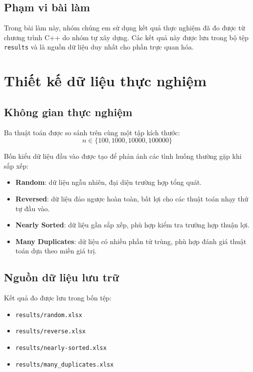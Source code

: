\subsection{Phạm vi bài làm}

Trong bài làm này, nhóm chúng em sử dụng kết quả thực nghiệm đã đo được từ chương trình C++ do nhóm tự xây dựng.
Các kết quả này được lưu trong bộ tệp \texttt{results} và là nguồn dữ liệu duy nhất cho phần trực quan hóa.

\section{Thiết kế dữ liệu thực nghiệm}

\subsection{Không gian thực nghiệm}

Ba thuật toán được so sánh trên cùng một tập kích thước:
\[
    n \in \{100, 1000, 10000, 100000\}
\]

Bốn kiểu dữ liệu đầu vào được tạo để phản ánh các tình huống thường gặp khi sắp xếp:
\begin{itemize}[leftmargin=1.2cm]
    \item \textbf{Random}: dữ liệu ngẫu nhiên, đại diện trường hợp tổng quát.
    \item \textbf{Reversed}: dữ liệu đảo ngược hoàn toàn, bất lợi cho các thuật toán nhạy thứ tự đầu vào.
    \item \textbf{Nearly Sorted}: dữ liệu gần sắp xếp, phù hợp kiểm tra trường hợp thuận lợi.
    \item \textbf{Many Duplicates}: dữ liệu có nhiều phần tử trùng, phù hợp đánh giá thuật toán dựa theo miền giá trị.
\end{itemize}

\subsection{Nguồn dữ liệu lưu trữ}

Kết quả đo được lưu trong bốn tệp:
\begin{itemize}[leftmargin=1.2cm]
    \item \texttt{results/random.xlsx}
    \item \texttt{results/reverse.xlsx}
    \item \texttt{results/nearly-sorted.xlsx}
    \item \texttt{results/many\_duplicates.xlsx}
\end{itemize}

